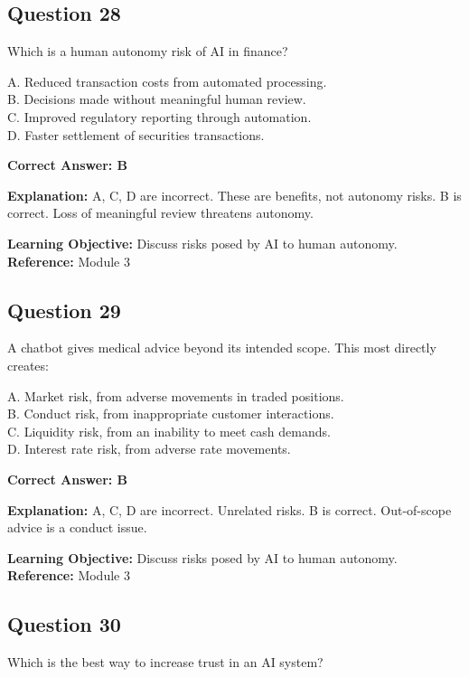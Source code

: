 \documentclass[11pt]{article}
\begin{document}
	\subsection*{Question 28}
	Which is a human autonomy risk of AI in finance?
	
	A. Reduced transaction costs from automated processing.\\
	B. Decisions made without meaningful human review.\\
	C. Improved regulatory reporting through automation.\\
	D. Faster settlement of securities transactions.
	
	\vspace{0.4em}
	\textbf{Correct Answer: B}
	
	\textbf{Explanation:}
	A, C, D are incorrect. These are benefits, not autonomy risks.
	B is correct. Loss of meaningful review threatens autonomy.
	
	\textbf{Learning Objective:} Discuss risks posed by AI to human autonomy.
	\textbf{Reference:} Module 3
	
	\subsection*{Question 29}
	A chatbot gives medical advice beyond its intended scope. This most
	directly creates:
	
	A. Market risk, from adverse movements in traded positions.\\
	B. Conduct risk, from inappropriate customer interactions.\\
	C. Liquidity risk, from an inability to meet cash demands.\\
	D. Interest rate risk, from adverse rate movements.
	
	\vspace{0.4em}
	\textbf{Correct Answer: B}
	
	\textbf{Explanation:}
	A, C, D are incorrect. Unrelated risks.
	B is correct. Out-of-scope advice is a conduct issue.
	
	\textbf{Learning Objective:} Discuss risks posed by AI to human autonomy.
	\textbf{Reference:} Module 3
	
	\subsection*{Question 30}
	Which is the best way to increase trust in an AI system?
	
\end{document}

